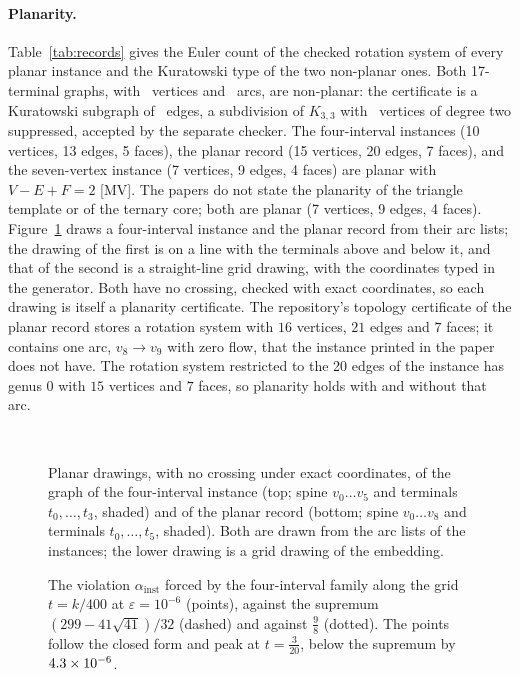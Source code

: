 \documentclass[11pt]{article}
\theoremstyle{remark}
\begin{document}
\paragraph{Planarity.} Table~\ref{tab:records} gives the Euler count of the checked rotation system of every planar instance and the Kuratowski type of the two non-planar ones. Both 17-terminal graphs, with \nkverts\ vertices and \nkarcs\ arcs, are non-planar: the certificate is a Kuratowski subgraph of \nkuratedges\ edges, a subdivision of $K_{3,3}$ with \nkuratsupp\ vertices of degree two suppressed, accepted by the separate checker. The four-interval instances (10 vertices, 13 edges, 5 faces), the planar record (15 vertices, 20 edges, 7 faces), and the seven-vertex instance (7 vertices, 9 edges, 4 faces) are planar with $V-E+F=2$ [MV]. The papers do not state the planarity of the triangle template or of the ternary core; both are planar (7 vertices, 9 edges, 4 faces).
Figure~\ref{fig:draw} draws a four-interval instance and the planar record from their arc lists; the drawing of the first is on a line with the terminals above and below it, and that of the second is a straight-line grid drawing, with the coordinates typed in the generator. Both have no crossing, checked with exact coordinates, so each drawing is itself a planarity certificate.
The repository's topology certificate of the planar record stores a rotation system with $16$ vertices, $21$ edges and $7$ faces; it contains one arc, $v_8\to v_9$ with zero flow, that the instance printed in the paper does not have. The rotation system restricted to the 20 edges of the instance has genus 0 with $15$ vertices and $7$ faces, so planarity holds with and without that arc.

\begin{figure}[t]
\centering
\\[10pt]

\caption{Planar drawings, with no crossing under exact coordinates, of the graph of the four-interval instance (top; spine $v_0\dots v_5$ and terminals $t_0,\dots,t_3$, shaded) and of the planar record (bottom; spine $v_0\dots v_8$ and terminals $t_0,\dots,t_5$, shaded). Both are drawn from the arc lists of the instances; the lower drawing is a grid drawing of the embedding.}
\label{fig:draw}
\end{figure}

\begin{figure}[t]
\centering

\caption{The violation $\alpha_{\mathrm{inst}}$ forced by the four-interval family along the grid $t=k/400$ at $\varepsilon=10^{-6}$ (points), against the supremum $(299-41\sqrt{41})/32$ (dashed) and against $\tfrac98$ (dotted). The points follow the closed form and peak at $t=\tfrac3{20}$, below the supremum by $4.3\times10^{-6}$.}
\label{fig:grid}
\end{figure}
\end{document}
